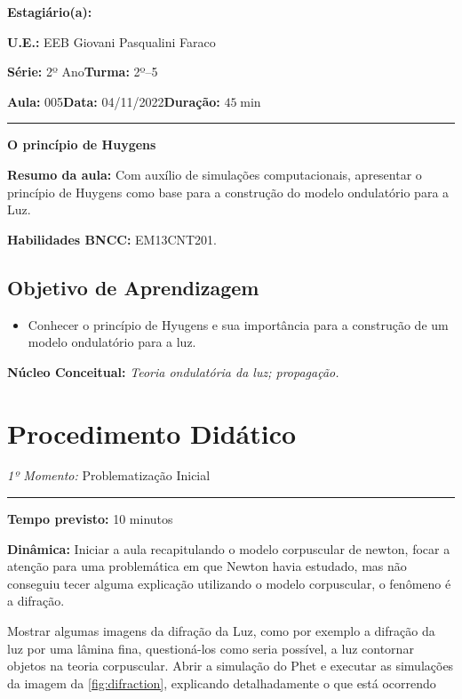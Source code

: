     \noindent \textbf{Estagiário(a): }\imprimirautor 
    
    \noindent \textbf{U.E.: }EEB Giovani Pasqualini Faraco
    
    \noindent \textbf{Série: }2º Ano\hfill{}\textbf{Turma: }2º--5
    
    \noindent \textbf{Aula:} 005\hfill{}\textbf{Data:} 04/11/2022\hfill{}\textbf{Duração:} $45\min$
    \rule{\textwidth}{.5pt}
    \bigskip{}  
    

    \noindent
    \begin{center}
      \textbf{O princípio de Huygens}
    \par\end{center}
    \vspace{20pt}
    \noindent \textbf{Resumo da aula:} Com auxílio de simulações computacionais, apresentar o princípio de Huygens como base para a construção do modelo ondulatório para a Luz.
    \smallskip
    \par\noindent \textbf{Habilidades BNCC:} EM13CNT201.
    \medskip
    \subsection*{Objetivo de Aprendizagem}
    \begin{itemize}
        \item Conhecer o princípio de Hyugens e sua importância para a construção de um modelo ondulatório para a luz. 
    \end{itemize}    
    \bigskip{}    
    \noindent \textbf{Núcleo Conceitual:} \emph{Teoria ondulatória da luz; propagação.}
    \newpage
    

    \section*{Procedimento Didático} 
    \noindent\emph{1º Momento:} Problematização Inicial
    \par\noindent\rule{.3\textwidth}{.5pt}  
    \par\noindent\textbf{Tempo previsto:} 10 minutos
    \smallskip
    \par\noindent\textbf{Dinâmica:} Iniciar a aula recapitulando o modelo corpuscular de newton, focar a atenção para uma problemática em que Newton havia estudado, mas não conseguiu tecer alguma explicação utilizando o modelo corpuscular, o fenômeno é a difração.

    Mostrar algumas imagens da difração da Luz, como por exemplo a difração da luz por uma lâmina fina, questioná-los como seria possível, a luz contornar objetos na teoria corpuscular. Abrir a simulação do Phet e executar as simulações da imagem da \autoref{fig:difraction}, explicando detalhadamente o que está ocorrendo 

